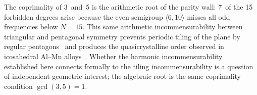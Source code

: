\documentclass[11pt,letterpaper]{article}
\theoremstyle{definition}
\newcommand{\gen}[1]{\langle #1 \rangle}
\begin{document}
\begin{remarkbox}
The coprimality of 3~and~5 is the arithmetic root of the parity wall: 7~of the 15 forbidden degrees arise because the even semigroup $\gen{6,10}$ misses all odd frequencies below $N=15$.  This same arithmetic incommensurability between triangular and pentagonal symmetry prevents periodic tiling of the plane by regular pentagons~\cite{Senechal1995} and produces the quasicrystalline order observed in icosahedral Al--Mn alloys~\cite{Shechtman1984}.  Whether the harmonic incommensurability established here connects formally to the tiling incommensurability is a question of independent geometric interest; the algebraic root is the same coprimality condition $\gcd(3,5)=1$.
\end{remarkbox}
\end{document}
